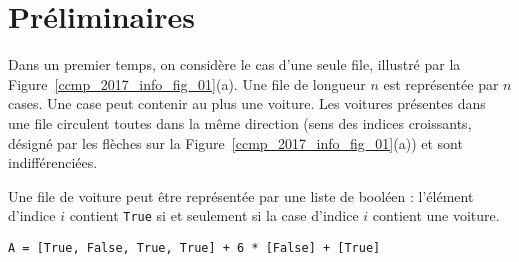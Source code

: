 	
\fi

\section{Préliminaires}



\ifprof
\else
Dans un premier temps, on considère le cas d'une seule file, illustré par la Figure~\ref{ccmp_2017_info_fig_01}(a). Une file de
longueur $n$ est représentée par $n$ cases. Une case peut contenir au plus une voiture. Les voitures
présentes dans une file circulent toutes dans la même direction (sens des indices croissants, désigné
par les flèches sur la Figure~\ref{ccmp_2017_info_fig_01}(a)) et sont indifférenciées.
\fi

\ifprof
\begin{corrige}
Une file de voiture peut \^etre représentée par une liste de booléen : l'élément d'indice $i$ contient \lstinline{True} si et seulement si la case d'indice $i$ contient une voiture.
\end{corrige}
\else
\fi

\ifprof
\begin{corrige}
 \lstinline{A = [True, False, True, True] + 6 * [False] + [True]}
\end{corrige}
\else
\fi

